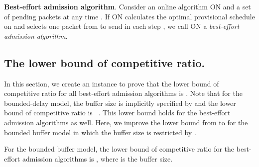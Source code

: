 \documentclass[final, 11pt]{article}
\begin{document}
\begin{Definition}
{\bf Best-effort admission algorithm}. Consider an online algorithm ON and a set of pending packets  at any time . If ON calculates the optimal provisional schedule  on  and selects one packet from  to send in each step , we call ON a {\em best-effort admission algorithm}.
\end{Definition}



\subsection{The lower bound of competitive ratio.}

In this section, we create an instance to prove that the lower bound of competitive ratio for all best-effort admission algorithms is . Note that for the bounded-delay model, the buffer size  is implicitly specified by  and the lower bound of competitive ratio is ~\cite{AMRR05, H01, CF03}. This lower bound holds for the best-effort admission algorithms as well. Here, we improve the lower bound from  to  for the bounded buffer model in which the buffer size is restricted by .

\begin{theorem}
For the bounded buffer model, the lower bound of competitive ratio for the best-effort admission algorithms is , where  is the buffer size.
\label{theorem:lowerbound}
\end{theorem}
\end{document}
